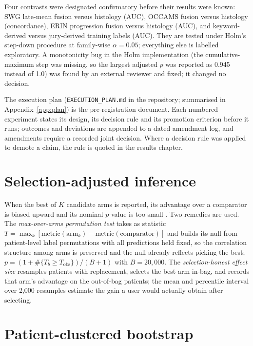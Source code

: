 Four contrasts were designated confirmatory before their results were known: SWG late-mean fusion versus histology (AUC), OCCAMS fusion versus histology (concordance), ERIN progression fusion versus histology (AUC), and keyword-derived versus jury-derived training labels (AUC). They are tested under Holm's step-down procedure \citep{holm1979} at family-wise $\alpha = 0.05$; everything else is labelled exploratory. A monotonicity bug in the Holm implementation (the cumulative-maximum step was missing, so the largest adjusted $p$ was reported as 0.945 instead of 1.0) was found by an external reviewer and fixed; it changed no decision.

The execution plan (\texttt{EXECUTION\_PLAN.md} in the repository; summarised in Appendix~\ref{app:plan}) is the pre-registration document. Each numbered experiment states its design, its decision rule and its promotion criterion before it runs; outcomes and deviations are appended to a dated amendment log, and amendments require a recorded joint decision. Where a decision rule was applied to demote a claim, the rule is quoted in the results chapter.

\section{Selection-adjusted inference}
\label{sec:selection_method}

When the best of $K$ candidate arms is reported, its advantage over a comparator is biased upward and its nominal $p$-value is too small \citep{nosek2018prereg}. Two remedies are used. The \emph{max-over-arms permutation test} takes as statistic $T = \max_k [\text{metric}(\text{arm}_k) - \text{metric}(\text{comparator})]$ and builds its null from patient-level label permutations with all predictions held fixed, so the correlation structure among arms is preserved and the null already reflects picking the best; $p = (1 + \#\{T_b \ge T_{\text{obs}}\})/(B+1)$ with $B = 20{,}000$. The \emph{selection-honest effect size} resamples patients with replacement, selects the best arm in-bag, and records that arm's advantage on the out-of-bag patients; the mean and percentile interval over 2,000 resamples estimate the gain a user would actually obtain after selecting.

\section{Patient-clustered bootstrap}
\label{sec:clustered}

